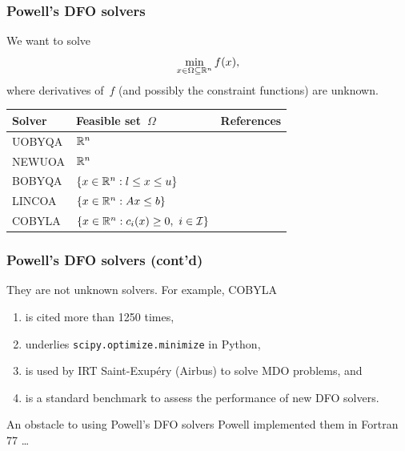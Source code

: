\documentclass{polyu-presentation}
\newcommand{\con}[1][]{c\ifthenelse{\equal{#1}{}}{}{_{#1}}}
\newcommand{\fset}{\Omega}
\newcommand{\iub}{\mathcal{I}}
\newcommand{\iter}[1][]{x\ifthenelse{\equal{#1}{}}{}{^{#1}}}
\newcommand{\obj}{f}
\newcommand{\xl}{l}
\newcommand{\xu}{u}
\begin{document}
\begin{frame}
    \frametitle{Powell's DFO solvers}

    We want to solve
    \begin{equation*}
        \min_{\iter \in \fset \subseteq \R^n} \obj(\iter),
    \end{equation*}
    where derivatives of~$\obj$ (and possibly the constraint functions) are \alert{unknown}.

    \bigskip

    \begin{center}
        \begin{tabular}{@{}lll@{}}
            \toprule
            Solver  & Feasible set~$\Omega$                                 & References\\
            \midrule
            UOBYQA  & $\mathbb{R}^n$                                                & \textcite{Powell_2002}\\
            NEWUOA  & $\mathbb{R}^n$                                                & \textcite{Powell_2006}\\
            BOBYQA  & $\set{x \in \R^n : \xl \le x \le \xu}$                & \textcite{Powell_2009}\\
            LINCOA  & $\{x \in \mathbb{R}^n : A x \le b\}$                        & \textcite{Powell_2015}\\
            COBYLA  & $\set{x \in \R^n : \con[i](x) \ge 0, ~ i \in \iub}$   & \textcite{Powell_1994}\\
            \bottomrule
        \end{tabular}
    \end{center}
\end{frame}

\begin{frame}
    \frametitle{Powell's DFO solvers (cont'd)}

    They are \alert{not} unknown solvers.
    For example, COBYLA
    \begin{enumerate}
        \item is cited more than \alert{\num{1250} times},
        \item underlies \texttt{scipy.optimize.minimize} in Python,
        \item is used by IRT Saint-Exup{\'{e}}ry (\alert{Airbus}) to solve MDO problems, and
        \item is a \alert{standard benchmark} to assess the performance of new DFO solvers.
    \end{enumerate}

    \bigskip

    \begin{block}{An obstacle to using Powell's DFO solvers}
        Powell implemented them in \alert{Fortran 77} \dots
    \end{block}
\end{frame}
\end{document}
